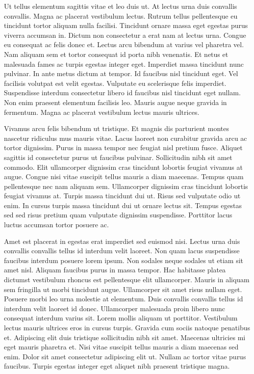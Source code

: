 \documentclass[11pt,a4paper]{article}
\begin{document}
Ut tellus elementum sagittis vitae et leo duis ut. At lectus urna duis convallis convallis. Magna ac placerat vestibulum lectus. Rutrum tellus pellentesque eu tincidunt tortor aliquam nulla facilisi. Tincidunt ornare massa eget egestas purus viverra accumsan in. Dictum non consectetur a erat nam at lectus urna. Congue eu consequat ac felis donec et. Lectus arcu bibendum at varius vel pharetra vel. Nam aliquam sem et tortor consequat id porta nibh venenatis. Et netus et malesuada fames ac turpis egestas integer eget. Imperdiet massa tincidunt nunc pulvinar. In ante metus dictum at tempor. Id faucibus nisl tincidunt eget. Vel facilisis volutpat est velit egestas. Vulputate eu scelerisque felis imperdiet. Suspendisse interdum consectetur libero id faucibus nisl tincidunt eget nullam. Non enim praesent elementum facilisis leo. Mauris augue neque gravida in fermentum. Magna ac placerat vestibulum lectus mauris ultrices.

Vivamus arcu felis bibendum ut tristique. Et magnis dis parturient montes nascetur ridiculus mus mauris vitae. Lacus laoreet non curabitur gravida arcu ac tortor dignissim. Purus in massa tempor nec feugiat nisl pretium fusce. Aliquet sagittis id consectetur purus ut faucibus pulvinar. Sollicitudin nibh sit amet commodo. Elit ullamcorper dignissim cras tincidunt lobortis feugiat vivamus at augue. Congue nisi vitae suscipit tellus mauris a diam maecenas. Tempus quam pellentesque nec nam aliquam sem. Ullamcorper dignissim cras tincidunt lobortis feugiat vivamus at. Turpis massa tincidunt dui ut. Risus sed vulputate odio ut enim. In cursus turpis massa tincidunt dui ut ornare lectus sit. Tempus egestas sed sed risus pretium quam vulputate dignissim suspendisse. Porttitor lacus luctus accumsan tortor posuere ac.

Amet est placerat in egestas erat imperdiet sed euismod nisi. Lectus urna duis convallis convallis tellus id interdum velit laoreet. Non quam lacus suspendisse faucibus interdum posuere lorem ipsum. Non sodales neque sodales ut etiam sit amet nisl. Aliquam faucibus purus in massa tempor. Hac habitasse platea dictumst vestibulum rhoncus est pellentesque elit ullamcorper. Mauris in aliquam sem fringilla ut morbi tincidunt augue. Ullamcorper sit amet risus nullam eget. Posuere morbi leo urna molestie at elementum. Duis convallis convallis tellus id interdum velit laoreet id donec. Ullamcorper malesuada proin libero nunc consequat interdum varius sit. Lorem mollis aliquam ut porttitor. Vestibulum lectus mauris ultrices eros in cursus turpis. Gravida cum sociis natoque penatibus et. Adipiscing elit duis tristique sollicitudin nibh sit amet. Maecenas ultricies mi eget mauris pharetra et. Nisi vitae suscipit tellus mauris a diam maecenas sed enim. Dolor sit amet consectetur adipiscing elit ut. Nullam ac tortor vitae purus faucibus. Turpis egestas integer eget aliquet nibh praesent tristique magna.
\end{document}
